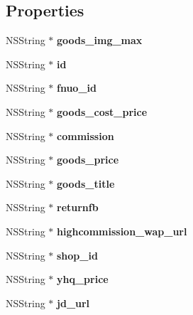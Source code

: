 \subsection*{Properties}
\begin{DoxyCompactItemize}
\item 
\mbox{\label{interface_shake_model_ac013ae2a643b67155fd9fc2c3a57efd7}} 
N\+S\+String $\ast$ {\bfseries goods\+\_\+img\+\_\+max}
\item 
\mbox{\label{interface_shake_model_a8cec5ba7e121e30928febb687162370a}} 
N\+S\+String $\ast$ {\bfseries id}
\item 
\mbox{\label{interface_shake_model_adedb352a88a8ae912ab43b1b76a2aa2a}} 
N\+S\+String $\ast$ {\bfseries fnuo\+\_\+id}
\item 
\mbox{\label{interface_shake_model_af6a9ef867642e0756105b11b31f11cc7}} 
N\+S\+String $\ast$ {\bfseries goods\+\_\+cost\+\_\+price}
\item 
\mbox{\label{interface_shake_model_a34334ec84a7c978c97d06074d9619b06}} 
N\+S\+String $\ast$ {\bfseries commission}
\item 
\mbox{\label{interface_shake_model_a9571c04154b5e81da365b707f497929e}} 
N\+S\+String $\ast$ {\bfseries goods\+\_\+price}
\item 
\mbox{\label{interface_shake_model_a739423cf8a44993943fd507ec882f31b}} 
N\+S\+String $\ast$ {\bfseries goods\+\_\+title}
\item 
\mbox{\label{interface_shake_model_a6f9bd591b675580bc6dbba0c4437cfb2}} 
N\+S\+String $\ast$ {\bfseries returnfb}
\item 
\mbox{\label{interface_shake_model_a0b576a663bd3c37a9e267c815778d702}} 
N\+S\+String $\ast$ {\bfseries highcommission\+\_\+wap\+\_\+url}
\item 
\mbox{\label{interface_shake_model_ae070327655c951c3d2db1faf365fc2c9}} 
N\+S\+String $\ast$ {\bfseries shop\+\_\+id}
\item 
\mbox{\label{interface_shake_model_aeeb2ce142e05d3c10ddf16ebdf99521a}} 
N\+S\+String $\ast$ {\bfseries yhq\+\_\+price}
\item 
\mbox{\label{interface_shake_model_a7cfd3a996275dc66a2a6d75b94e977f2}} 
N\+S\+String $\ast$ {\bfseries jd\+\_\+url}
\end{DoxyCompactItemize}


